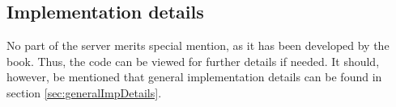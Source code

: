\documentclass[Main]{subfiles}
\begin{document}
\subsection{Implementation details}
No part of the server merits special mention, as it has been developed by the book. 
Thus, the code can be viewed for further details if needed.
It should, however, be mentioned that general implementation details can be found in section \ref{sec:generalImpDetails}.
\end{document}
